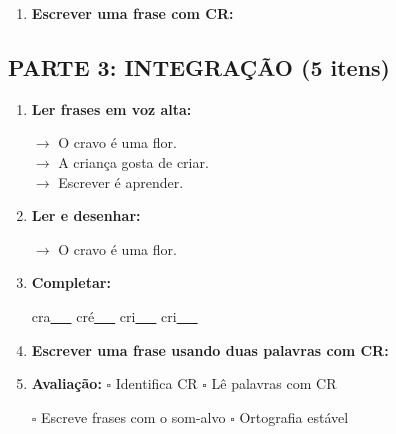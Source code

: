 \begin{exercicio}
\begin{enumerate}[resume]
  \item \textbf{Escrever uma frase com CR:}
  \begin{center}
  \underline{\hspace{12cm}}
  \end{center}

\end{enumerate}

\subsection*{PARTE 3: INTEGRAÇÃO (5 itens)}

\begin{enumerate}[resume]

  \item \textbf{Ler frases em voz alta:}
  \begin{center}
  $\rightarrow$ O cravo é uma flor.\\
  $\rightarrow$ A criança gosta de criar.\\
  $\rightarrow$ Escrever é aprender.\\
  \end{center}

  \item \textbf{Ler e desenhar:}
  \begin{center}
  $\rightarrow$ O cravo é uma flor.
  \end{center}
  \begin{center}
  \end{center}

  \item \textbf{Completar:}
  \begin{center}
  cra\underline{~~~} \quad cré\underline{~~~} \quad cri\underline{~~~} \quad cri\underline{~~~}
  \end{center}

  \item \textbf{Escrever uma frase usando duas palavras com CR:}
  \begin{center}
  \underline{\hspace{12cm}}
  \end{center}

  \item \textbf{Avaliação:} $\square$ Identifica CR \quad $\square$ Lê palavras com CR
  \begin{center}
  $\square$ Escreve frases com o som-alvo \quad $\square$ Ortografia estável
  \end{center}


\end{enumerate}
\end{exercicio}
